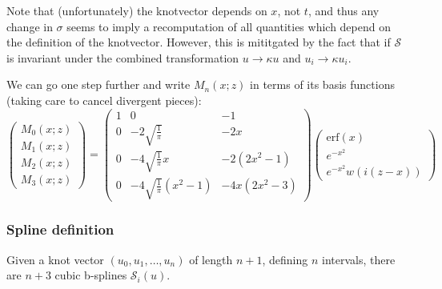 \documentclass[a4paper,10pt,twosided]{article}
\begin{document}
Note that (unfortunately) the knotvector depends on $x$, not $t$, and thus any change in $\sigma$ seems to imply a recomputation 
of all quantities which depend on the definition of the knotvector. However, this is mititgated by the fact that if $\mathcal{S}$
is invariant under the combined transformation $u \rightarrow \kappa u$ and $u_i \rightarrow \kappa u_i $.

We can go one step further and write $M_n(x;z)$ in terms of its basis functions (taking
care to cancel divergent pieces):
\begin{equation}
     \left( \begin{array}{c} M_0(x;z) \\ M_1(x;z) \\ M_2(x;z) \\ M_3(x;z) \end{array} \right)
     = \left( \begin{array}{ccc}
          1 &  0 & -1
     \\   0 & -2\sqrt{\frac{1}{\pi}}& -2x 
     \\   0 & -4\sqrt{\frac{1}{\pi}}x& -2(2x^2-1) 
     \\   0 & -4\sqrt{\frac{1}{\pi}}(x^2-1)& -4x(2x^2-3) 
       \end{array}\right) 
       \left(\begin{array}{c} 
                      \mathrm{erf}\left(x\right)
              \\      e^{-x^2}
              \\      e^{-x^2}w\left(i(z-x) \right)
             \end{array} \right)
\end{equation}

\subsubsection{Spline definition}


Given a knot vector $(u_0,u_1,\dots,u_n)$ of length $n+1$, defining $n$ intervals, there are $n+3$ cubic b-splines $\mathcal{S}_i(u)$.
\end{document}
